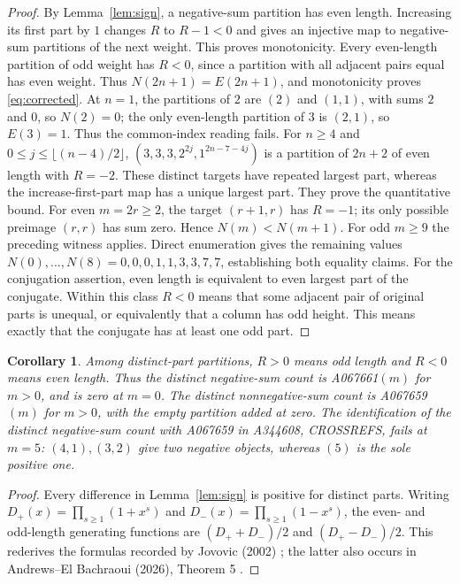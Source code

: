 \documentclass[11pt]{article}
\newtheorem{corollary}[theorem]{Corollary}
\begin{document}
\begin{proof}
By Lemma~\ref{lem:sign}, a negative-sum partition has even length.
Increasing its first part by $1$ changes $R$ to $R-1<0$ and gives
an injective map to negative-sum partitions of the next weight.
This proves monotonicity.
Every even-length partition of odd weight has $R<0$, since a partition
with all adjacent pairs equal has even weight. Thus $N(2n+1)=E(2n+1)$,
and monotonicity proves \eqref{eq:corrected}.
At $n=1$, the partitions of $2$ are $(2)$ and $(1,1)$, with sums $2$
and $0$, so $N(2)=0$; the only even-length partition of $3$ is $(2,1)$,
so $E(3)=1$. Thus the common-index reading fails.
For $n\ge4$ and $0\le j\le\lfloor(n-4)/2\rfloor$,
$(3,3,3,2^{2j},1^{2n-7-4j})$ is a partition of $2n+2$
of even length with $R=-2$. These distinct targets have repeated
largest part, whereas the increase-first-part map has a unique largest
part. They prove the quantitative bound. For even $m=2r\ge2$,
the target $(r+1,r)$ has $R=-1$; its only possible preimage $(r,r)$
has sum zero. Hence $N(m)<N(m+1)$. For odd $m\ge9$ the preceding
witness applies. Direct enumeration gives the remaining values
$N(0),\ldots,N(8)=0,0,0,1,1,3,3,7,7$, establishing both equality claims.
For the conjugation assertion, even length is equivalent to even
largest part of the conjugate. Within this class $R<0$ means that
some adjacent pair of original parts is unequal, or equivalently
that a column has odd height. This means exactly that the conjugate
has at least one odd part.
\end{proof}

\begin{corollary}\label{cor:distinct}
Among distinct-part partitions, $R>0$ means odd length and $R<0$
means even length. Thus the distinct negative-sum count is
\textup{A067661}$(m)$ for $m>0$, and is zero at $m=0$.
The distinct nonnegative-sum count is \textup{A067659}$(m)$ for $m>0$,
with the empty partition added at zero.
The identification of the distinct negative-sum count with A067659
in A344608, CROSSREFS, fails at $m=5$: $(4,1),(3,2)$ give two
negative objects, whereas $(5)$ is the sole positive one.
\end{corollary}
\begin{proof}
Every difference in Lemma~\ref{lem:sign} is positive for distinct parts.
Writing $D_+(x)=\prod_{s\ge1}(1+x^s)$ and
$D_-(x)=\prod_{s\ge1}(1-x^s)$, the even- and odd-length generating
functions are $(D_++D_-)/2$ and $(D_+-D_-)/2$.
This rederives the formulas recorded by Jovovic (2002)
\cite{a067659,a067661}; the latter also occurs in
Andrews--El Bachraoui (2026), Theorem 5 \cite{andrews}.
\end{proof}
\end{document}

